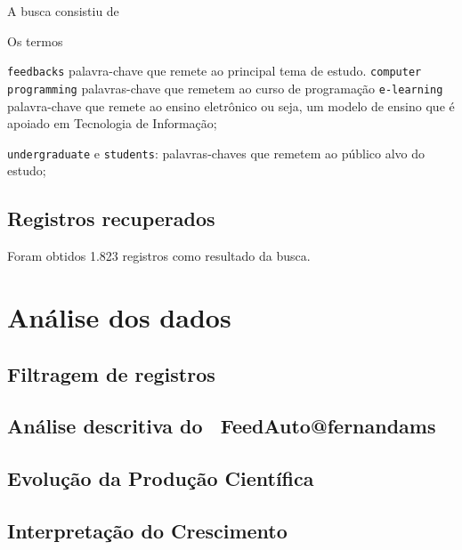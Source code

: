 A busca consistiu de 

Os termos

 \texttt{feedbacks} palavra-chave que remete ao principal tema de estudo.
 \texttt{computer programming} palavras-chave que remetem ao curso de programação 
 \texttt{e-learning} palavra-chave  que remete ao ensino eletrônico ou seja, um modelo de ensino que é apoiado em Tecnologia de Informação;

\texttt{undergraduate} e \texttt{students}: palavras-chaves que remetem ao público alvo do estudo; 

\subsection{Registros recuperados}

Foram obtidos 1.823 registros como resultado da busca. 

\section{Análise dos dados}

\subsection{Filtragem de registros}

\subsection{Análise descritiva do \dataset\ FeedAuto@fernandams} 

\subsection{Evolução da Produção Científica}

\subsection{Interpretação do Crescimento}

